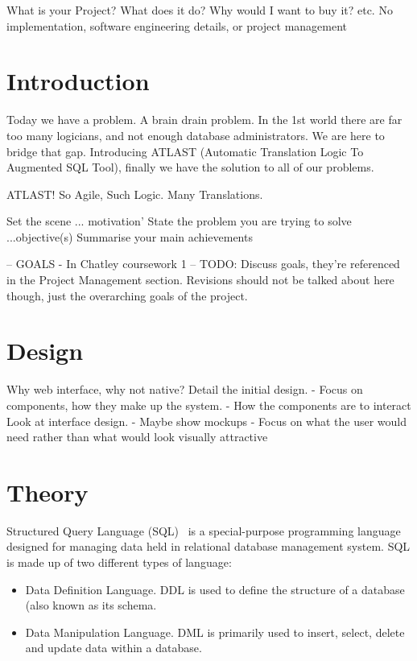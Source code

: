 \documentclass[a4wide, 11pt]{article}
\begin{document}
        What is your Project? What does it do? Why would I want to buy it? etc.
        No implementation, software engineering details, or project management

\section{Introduction}

Today we have a problem. A brain drain problem. In the 1st world there are 
far too many logicians, and not enough database administrators. We are here
to bridge that gap. Introducing ATLAST (Automatic Translation Logic To Augmented SQL Tool), finally we have the solution to all of our problems.

ATLAST! So Agile, Such Logic. Many Translations.


        Set the scene ... motivation'
        State the problem you are trying to solve ...objective(s)
        Summarise your main achievements 

        -- GOALS - In Chatley coursework 1 --
        TODO: Discuss goals, they're referenced in the Project Management
        section. Revisions should not be talked about here though, just the
        overarching goals of the project.

\section{Design}

        Why web interface, why not native?
        Detail the initial design.
          - Focus on components, how they make up the system.
          - How the components are to interact
        Look at interface design.
          - Maybe show mockups
          - Focus on what the user would need rather than what would look
            visually attractive

\section{Theory}

Structured Query Language (SQL)~\cite{wiki:SQL} is a special-purpose
programming language designed for managing data held in relational database
management system. SQL is made up of two different types of language:

\begin{itemize}

    \item
      Data Definition Language. DDL is used to define the structure of a
      database (also known as its schema.
    \item 
      Data Manipulation Language. DML is primarily used to insert, select,
      delete and update data within a database.

\end{itemize}
\end{document}
